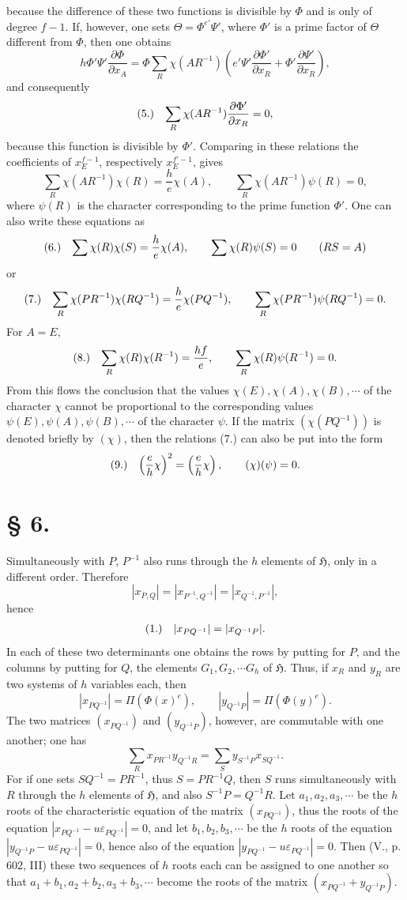 \documentclass[11pt]{article}
\makeatletter
\newcommand{\Hgrp}{\mathfrak{H}}
\newcommand{\frobtag}[2]{\[\begin{array}{@{}r@{\quad}l@{}}\textup{(#1)} & \displaystyle #2\end{array}\]}
\newcommand{\frobtagc}[2]{\[\begin{array}{@{}r@{\quad}c@{}}\textup{(#1)} & \displaystyle #2\end{array}\]}
\makeatother
\begin{document}
because the difference of these two functions is divisible by $\Phi$ and is only of degree $f-1$. If, however, one sets $\Theta=\Phi^{e'}\Psi'$, where $\Phi'$ is a prime factor of $\Theta$ different from $\Phi$, then one obtains
\[
h\Phi'\Psi'\frac{\partial\Phi}{\partial x_A}=\Phi\sum_R\chi(AR^{-1})\left(e'\Psi'\frac{\partial\Phi'}{\partial x_R}+\Phi'\frac{\partial\Psi'}{\partial x_R}\right),
\]
and consequently
\frobtagc{5.}{\sum_R\chi(AR^{-1})\frac{\partial\Phi'}{\partial x_R}=0,}
because this function is divisible by $\Phi'$. Comparing in these relations the coefficients of $x_E^{f-1}$, respectively $x_E^{f'-1}$, gives
\[
\sum_R\chi(AR^{-1})\chi(R)=\frac{h}{e}\chi(A),\qquad \sum_R\chi(AR^{-1})\psi(R)=0,
\]
where $\psi(R)$ is the character corresponding to the prime function $\Phi'$. One can also write these equations as
\frobtag{6.}{\sum\chi(R)\chi(S)=\frac{h}{e}\chi(A),\qquad \sum\chi(R)\psi(S)=0\qquad(RS=A)}
or
\frobtag{7.}{\sum_R\chi(PR^{-1})\chi(RQ^{-1})=\frac{h}{e}\chi(PQ^{-1}),\qquad \sum_R\chi(PR^{-1})\psi(RQ^{-1})=0.}
For $A=E$,
\frobtag{8.}{\sum_R\chi(R)\chi(R^{-1})=\frac{hf}{e},\qquad \sum_R\chi(R)\psi(R^{-1})=0.}
From this flows the conclusion that the values $\chi(E),\chi(A),\chi(B),\cdots$ of the character $\chi$ cannot be proportional to the corresponding values $\psi(E),\psi(A),\psi(B),\cdots$ of the character $\psi$. If the matrix $(\chi(PQ^{-1}))$ is denoted briefly by $(\chi)$, then the relations (7.) can also be put into the form
\frobtagc{9.}{\left(\frac{e}{h}\chi\right)^2=\left(\frac{e}{h}\chi\right),\qquad (\chi)(\psi)=0.}

\section*{§ 6.}

Simultaneously with $P$, $P^{-1}$ also runs through the $h$ elements of $\Hgrp$, only in a different order. Therefore
\[
|x_{P,Q}|=|x_{P^{-1},Q^{-1}}|=|x_{Q^{-1},P^{-1}}|,
\]
hence
\frobtagc{1.}{|x_{PQ^{-1}}|=|x_{Q^{-1}P}|.}
In each of these two determinants one obtains the rows by putting for $P$, and the columns by putting for $Q$, the elements $G_1,G_2,\cdots G_h$ of $\Hgrp$. Thus, if $x_R$ and $y_R$ are two systems of $h$ variables each, then
\[
|x_{PQ^{-1}}|=\Pi(\Phi(x)^e),\qquad |y_{Q^{-1}P}|=\Pi(\Phi(y)^e).
\]
The two matrices $(x_{PQ^{-1}})$ and $(y_{Q^{-1}P})$, however, are commutable with one another; one has
\[
\sum_R x_{PR^{-1}}y_{Q^{-1}R}=\sum_S y_{S^{-1}P}x_{SQ^{-1}}.
\]
For if one sets $SQ^{-1}=PR^{-1}$, thus $S=PR^{-1}Q$, then $S$ runs simultaneously with $R$ through the $h$ elements of $\Hgrp$, and also $S^{-1}P=Q^{-1}R$. Let $a_1,a_2,a_3,\cdots$ be the $h$ roots of the characteristic equation of the matrix $(x_{PQ^{-1}})$, thus the roots of the equation $|x_{PQ^{-1}}-u\varepsilon_{PQ^{-1}}|=0$, and let $b_1,b_2,b_3,\cdots$ be the $h$ roots of the equation $|y_{Q^{-1}P}-u\varepsilon_{PQ^{-1}}|=0$, hence also of the equation $|y_{PQ^{-1}}-u\varepsilon_{PQ^{-1}}|=0$. Then (V., p. 602, III) these two sequences of $h$ roots each can be assigned to one another so that $a_1+b_1,a_2+b_2,a_3+b_3,\cdots$ become the roots of the matrix $(x_{PQ^{-1}}+y_{Q^{-1}P})$.
\end{document}
